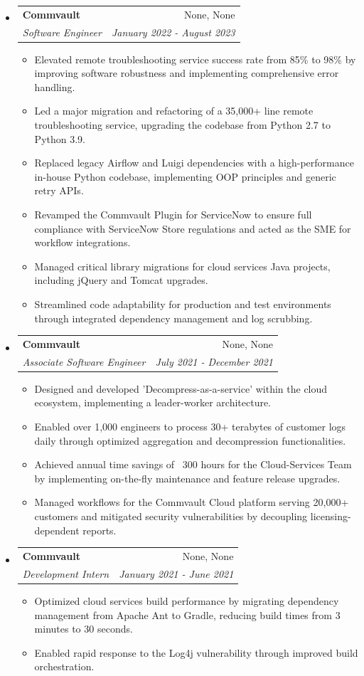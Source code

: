 \documentclass[letterpaper,11pt]{article}
\makeatletter
\newcommand{\resitem}[1]{\item #1 \vspace{-2pt}}
\newcommand{\ressubheading}[4]{
    \begin{tabular*}{6.5in}{p{4.8in}@{\extracolsep{\fill}}r}
            \textbf{#1} & #2 \\
            \textit{#3} & \textit{#4} \\
    \end{tabular*}\vspace{-8pt}}
\makeatother
\begin{document}
      \begin{itemize}
        \item \ressubheading{Commvault}{None, None}{Software Engineer}{January 2022 - August 2023}
        \begin{itemize}
            \resitem{Elevated remote troubleshooting service success rate from 85\% to 98\% by improving software robustness and implementing comprehensive error handling.}
            \resitem{Led a major migration and refactoring of a 35,000+ line remote troubleshooting service, upgrading the codebase from Python 2.7 to Python 3.9.}
            \resitem{Replaced legacy Airflow and Luigi dependencies with a high-performance in-house Python codebase, implementing OOP principles and generic retry APIs.}
            \resitem{Revamped the Commvault Plugin for ServiceNow to ensure full compliance with ServiceNow Store regulations and acted as the SME for workflow integrations.}
            \resitem{Managed critical library migrations for cloud services Java projects, including jQuery and Tomcat upgrades.}
            \resitem{Streamlined code adaptability for production and test environments through integrated dependency management and log scrubbing.}
        \end{itemize}
        \item \ressubheading{Commvault}{None, None}{Associate Software Engineer}{July 2021 - December 2021}
        \begin{itemize}
            \resitem{Designed and developed 'Decompress-as-a-service' within the cloud ecosystem, implementing a leader-worker architecture.}
            \resitem{Enabled over 1,000 engineers to process 30+ terabytes of customer logs daily through optimized aggregation and decompression functionalities.}
            \resitem{Achieved annual time savings of ~300 hours for the Cloud-Services Team by implementing on-the-fly maintenance and feature release upgrades.}
            \resitem{Managed workflows for the Commvault Cloud platform serving 20,000+ customers and mitigated security vulnerabilities by decoupling licensing-dependent reports.}
        \end{itemize}
        \item \ressubheading{Commvault}{None, None}{Development Intern}{January 2021 - June 2021}
        \begin{itemize}
            \resitem{Optimized cloud services build performance by migrating dependency management from Apache Ant to Gradle, reducing build times from 3 minutes to 30 seconds.}
            \resitem{Enabled rapid response to the Log4j vulnerability through improved build orchestration.}

\end{itemize}
\end{itemize}
\end{document}
